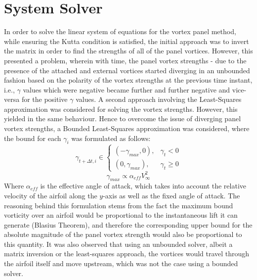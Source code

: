 \section{System Solver}
In order to solve the linear system of equations for the vortex panel method, while ensuring the Kutta condition is satisfied, the initial approach was to invert the matrix in order to find the strengths of all of the panel vortices.
However, this presented a problem, wherein with time, the panel vortex strengths - due to the presence of the attached and external vortices started diverging in an unbounded fashion based on the polarity of the vortex strengths at the previous time instant, i.e., $\gamma$ values which were negative became further and further negative and vice-versa for the positive $\gamma$ values.
A second approach involving the Least-Squares approximation was considered for solving the vortex strengths. However, this yielded in the same behaviour. Hence to overcome the issue of diverging panel vortex strengths, a Bounded Least-Squares approximation was considered, where the bound for each $\gamma_i$ was formulated as follows:
\begin{equation}
    \gamma_{t+\Delta t, i} \in \begin{cases}
			(-\gamma_{max}, 0), & \gamma_{t} < 0\\
            (0, \gamma_{max}), & \gamma_{t} \geq 0
		 \end{cases}
\end{equation}
\begin{equation}
    \gamma_{max} \propto \alpha_{eff} V_{\infty}^2
\end{equation}
Where $\alpha_{eff}$ is the effective angle of attack, which takes into account the relative velocity of the airfoil along the $y$-axis as well as the fixed angle of attack.
The reasoning behind this formulation stems from the fact the maximum bound vorticity over an airfoil would be proportional to the instantaneous lift it can generate (Blasius Theorem), and therefore the corresponding upper bound for the absolute magnitude of the panel vortex strength would also be proportional to this quantity.
It was also observed that using an unbounded solver, albeit a matrix inversion or the least-squares approach, the vortices would travel through the airfoil itself and move upstream, which was not the case using a bounded solver.

